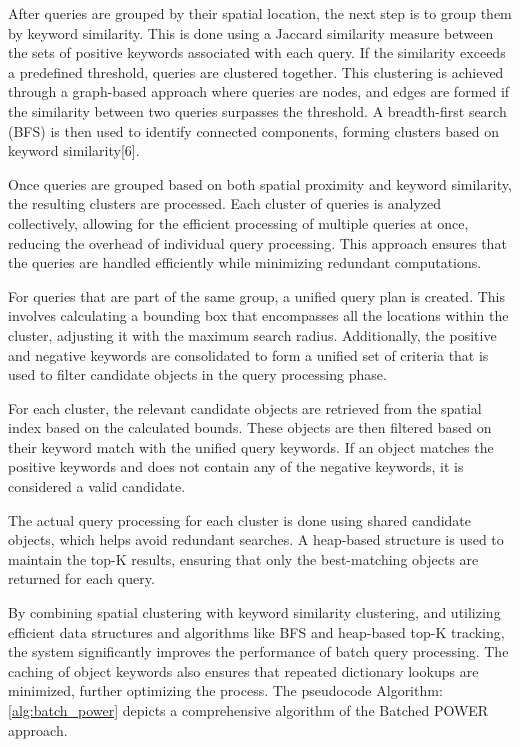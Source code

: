 \documentclass[conference]{IEEEtran}
\begin{document}
    After queries are grouped by their spatial location, the next step is to group them by keyword similarity. This is done using a Jaccard similarity measure between the sets of positive keywords associated with each query. If the similarity exceeds a predefined threshold, queries are clustered together. This clustering is achieved through a graph-based approach where queries are nodes, and edges are formed if the similarity between two queries surpasses the threshold. A breadth-first search (BFS) is then used to identify connected components, forming clusters based on keyword similarity[6].
    
    Once queries are grouped based on both spatial proximity and keyword similarity, the resulting clusters are processed. Each cluster of queries is analyzed collectively, allowing for the efficient processing of multiple queries at once, reducing the overhead of individual query processing. This approach ensures that the queries are handled efficiently while minimizing redundant computations.
    
    For queries that are part of the same group, a unified query plan is created. This involves calculating a bounding box that encompasses all the locations within the cluster, adjusting it with the maximum search radius. Additionally, the positive and negative keywords are consolidated to form a unified set of criteria that is used to filter candidate objects in the query processing phase.
    
    For each cluster, the relevant candidate objects are retrieved from the spatial index based on the calculated bounds. These objects are then filtered based on their keyword match with the unified query keywords. If an object matches the positive keywords and does not contain any of the negative keywords, it is considered a valid candidate.
    
    The actual query processing for each cluster is done using shared candidate objects, which helps avoid redundant searches. A heap-based structure is used to maintain the top-K results, ensuring that only the best-matching objects are returned for each query.
    
    By combining spatial clustering with keyword similarity clustering, and utilizing efficient data structures and algorithms like BFS and heap-based top-K tracking, the system significantly improves the performance of batch query processing. The caching of object keywords also ensures that repeated dictionary lookups are minimized, further optimizing the process. The pseudocode Algorithm: \ref{alg:batch_power} depicts a comprehensive algorithm of the Batched POWER approach.
    
\end{document}
